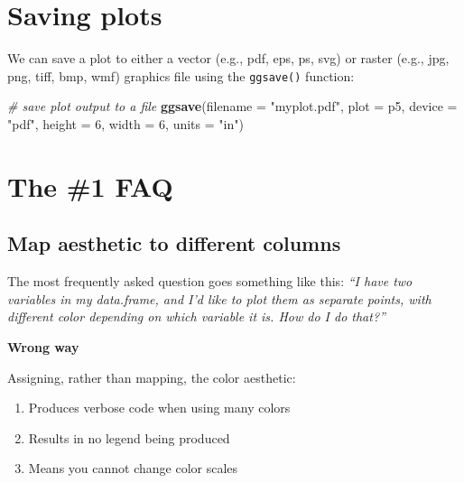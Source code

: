 \documentclass[
]{book}
\newenvironment{Shaded}{\begin{snugshade}}{\end{snugshade}}
\newcommand{\CommentTok}[1]{\textcolor[rgb]{0.56,0.35,0.01}{\textit{#1}}}
\newcommand{\DataTypeTok}[1]{\textcolor[rgb]{0.13,0.29,0.53}{#1}}
\newcommand{\DecValTok}[1]{\textcolor[rgb]{0.00,0.00,0.81}{#1}}
\newcommand{\KeywordTok}[1]{\textcolor[rgb]{0.13,0.29,0.53}{\textbf{#1}}}
\newcommand{\NormalTok}[1]{#1}
\newcommand{\StringTok}[1]{\textcolor[rgb]{0.31,0.60,0.02}{#1}}
\providecommand{\tightlist}{%
  \setlength{\itemsep}{0pt}\setlength{\parskip}{0pt}}
\begin{document}
\hypertarget{saving-plots}{%
\section{Saving plots}\label{saving-plots}}

We can save a plot to either a vector (e.g., pdf, eps, ps, svg) or raster (e.g., jpg, png, tiff, bmp, wmf) graphics file using the \texttt{ggsave()} function:

\begin{Shaded}
\begin{Highlighting}[]
\CommentTok{\# save plot output to a file}
\KeywordTok{ggsave}\NormalTok{(}\DataTypeTok{filename =} \StringTok{"myplot.pdf"}\NormalTok{, }\DataTypeTok{plot =}\NormalTok{ p5, }\DataTypeTok{device =} \StringTok{"pdf"}\NormalTok{, }
       \DataTypeTok{height =} \DecValTok{6}\NormalTok{, }\DataTypeTok{width =} \DecValTok{6}\NormalTok{, }\DataTypeTok{units =} \StringTok{"in"}\NormalTok{)}
\end{Highlighting}
\end{Shaded}

\hypertarget{the-1-faq}{%
\section{The \#1 FAQ}\label{the-1-faq}}

\hypertarget{map-aesthetic-to-different-columns}{%
\subsection{Map aesthetic to different columns}\label{map-aesthetic-to-different-columns}}

The most frequently asked question goes something like this: \emph{``I have two variables in my data.frame, and I'd like to plot them as separate points, with different color depending on which variable it is. How do I do that?''}

\textbf{Wrong way}

Assigning, rather than mapping, the color aesthetic:

\begin{enumerate}
\def\labelenumi{\arabic{enumi}.}
\tightlist
\item
  Produces verbose code when using many colors
\item
  Results in no legend being produced
\item
  Means you cannot change color scales
\end{enumerate}
\end{document}
